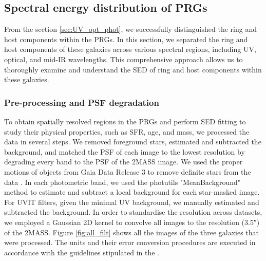 \documentclass{pas}
\begin{document}
\subsection{Spectral energy distribution of PRGs}
From the section \ref{sec:UV_opt_phot}, we successfully distinguished the ring and host components within the PRGs. In this section, we separated the ring and host components of these galaxies across various spectral regions, including UV, optical, and mid-IR wavelengths. This comprehensive approach allows us to thoroughly examine and understand the SED of ring and host components within these galaxies. 
\subsubsection{{Pre-processing and PSF degradation}}
{To obtain spatially resolved regions in the PRGs and perform SED fitting to study their physical properties, such as SFR, age, and mass, we processed the data in several steps. We removed foreground stars, estimated and subtracted the background, and matched the PSF of each image to the lowest resolution by degrading every band to the PSF of the 2MASS image. We used the proper motions of objects from Gaia Data Release 3 \citep[Gaia DR3;][]{GaiaCollaboration2023} to remove definite stars from the data \citep{2022Buzzosplus,2024akr_2}. In each photometric band, we used the photutils "MeanBackground" method \citep{larry_bradley_2023_Photutils} to estimate and subtract a local background for each star-masked image. For UVIT filters, given the minimal UV background, we manually estimated and subtracted the background. In order to standardise the resolution across datasets, we employed a Gaussian 2D kernel to convolve all images to the resolution (\ang{;;3.5}) of the 2MASS. Figure \ref{fig:all_filt} shows all the images of the three galaxies that were processed. The units and their error conversion procedures are executed in accordance with the guidelines stipulated in the \cite{2021pixedfit_abdurro}. }

\end{document}
